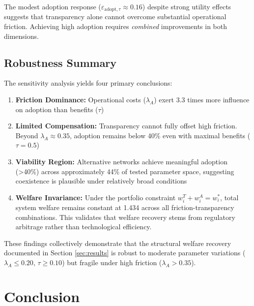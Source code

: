 \documentclass[12pt]{article}
\begin{document}
The modest adoption response ($\varepsilon_{\text{adopt},\tau} \approx 0.16$) despite strong utility effects suggests that transparency alone cannot overcome substantial operational friction. Achieving high adoption requires \textit{combined} improvements in both dimensions.

\subsection{Robustness Summary}

The sensitivity analysis yields four primary conclusions:

\begin{enumerate}[noitemsep]
    \item \textbf{Friction Dominance:} Operational costs ($\lambda_A$) exert 3.3 times more influence on adoption than benefits ($\tau$)
    
    \item \textbf{Limited Compensation:} Transparency cannot fully offset high friction. Beyond $\lambda_A \approx 0.35$, adoption remains below 40\% even with maximal benefits ($\tau = 0.5$)
    
    \item \textbf{Viability Region:} Alternative networks achieve meaningful adoption (>40\%) across approximately 44\% of tested parameter space, suggesting coexistence is plausible under relatively broad conditions
    
    \item \textbf{Welfare Invariance:} Under the portfolio constraint $w_i^T + w_i^A = w_i^*$, total system welfare remains constant at 1.434 across all friction-transparency combinations. This validates that welfare recovery stems from regulatory arbitrage rather than technological efficiency.
\end{enumerate}

These findings collectively demonstrate that the structural welfare recovery documented in Section \ref{sec:results} is robust to moderate parameter variations ($\lambda_A \leq 0.20$, $\tau \geq 0.10$) but fragile under high friction ($\lambda_A > 0.35$).


\section{Conclusion}
\label{sec:conclusion}
\end{document}
